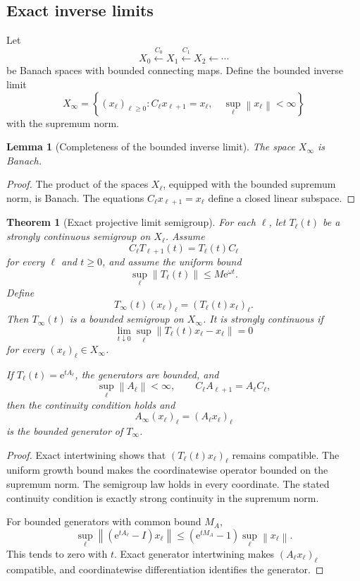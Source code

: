 \documentclass{aomart}
\newtheorem{theorem}{Theorem}[section]
\newtheorem{lemma}[lemma]{Lemma}
\theoremstyle{definition}
\theoremstyle{remark}
\newcommand{\e}{\mathrm e}
\newcommand{\norm}[1]{\left\lVert#1\right\rVert}
\begin{document}
\subsection{Exact inverse limits}

Let
\[
X_0\xleftarrow{C_0}X_1\xleftarrow{C_1}X_2\xleftarrow{}\cdots
\]
be Banach spaces with bounded connecting maps. Define the bounded inverse limit
\[
X_\infty
=
\left\{
(x_\ell)_{\ell\geq0}:
C_\ell x_{\ell+1}=x_\ell,
\quad
\sup_\ell\norm{x_\ell}<\infty
\right\}
\]
with the supremum norm.

\begin{lemma}[Completeness of the bounded inverse limit]\label{lem:inverse_limit_banach}
The space \(X_\infty\) is Banach.
\end{lemma}

\begin{proof}
The product of the spaces \(X_\ell\), equipped with the bounded supremum norm, is Banach. The equations \(C_\ell x_{\ell+1}=x_\ell\) define a closed linear subspace.
\end{proof}

\begin{theorem}[Exact projective limit semigroup]\label{thm:exact_projective_limit}
For each \(\ell\), let \(T_\ell(t)\) be a strongly continuous semigroup on \(X_\ell\). Assume
\[
C_\ell T_{\ell+1}(t)=T_\ell(t)C_\ell
\]
for every \(\ell\) and \(t\geq0\), and assume the uniform bound
\[
\sup_\ell\norm{T_\ell(t)}\leq M\e^{\omega t}.
\]
Define
\[
T_\infty(t)(x_\ell)_\ell
=
(T_\ell(t)x_\ell)_\ell.
\]
Then \(T_\infty(t)\) is a bounded semigroup on \(X_\infty\). It is strongly continuous if
\[
\lim_{t\downarrow0}
\sup_\ell
\norm{T_\ell(t)x_\ell-x_\ell}=0
\]
for every \((x_\ell)_\ell\in X_\infty\).

If \(T_\ell(t)=\e^{tA_\ell}\), the generators are bounded, and
\[
\sup_\ell\norm{A_\ell}<\infty,
\qquad
C_\ell A_{\ell+1}=A_\ell C_\ell,
\]
then the continuity condition holds and
\[
A_\infty(x_\ell)_\ell=(A_\ell x_\ell)_\ell
\]
is the bounded generator of \(T_\infty\).
\end{theorem}

\begin{proof}
Exact intertwining shows that \((T_\ell(t)x_\ell)_\ell\) remains compatible. The uniform growth bound makes the coordinatewise operator bounded on the supremum norm. The semigroup law holds in every coordinate. The stated continuity condition is exactly strong continuity in the supremum norm.

For bounded generators with common bound \(M_A\),
\[
\sup_\ell
\norm{(\e^{tA_\ell}-I)x_\ell}
\leq
(\e^{tM_A}-1)\sup_\ell\norm{x_\ell}.
\]
This tends to zero with \(t\). Exact generator intertwining makes \((A_\ell x_\ell)_\ell\) compatible, and coordinatewise differentiation identifies the generator.
\end{proof}
\end{document}
